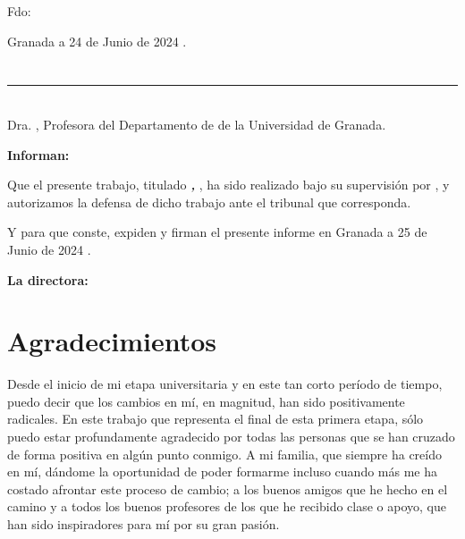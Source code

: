 \vspace{6cm}

\noindent Fdo: \myName

\vspace{2cm}

\begin{flushright}
Granada a 24 de Junio de 2024 .
\end{flushright}


\chapter*{}
\thispagestyle{empty}

\noindent\rule[-1ex]{\textwidth}{2pt}\\[4.5ex]

Dra. \textbf{\myProf}, Profesora del Departamento de \myDepartment de la Universidad de Granada.


\vspace{0.5cm}

\textbf{Informan:}

\vspace{0.5cm}

Que el presente trabajo, titulado \textit{\textbf{\myTitle, \mySubTitle}},
ha sido realizado bajo su supervisión por \textbf{\myName}, y autorizamos la defensa de dicho trabajo ante el tribunal que corresponda.

\vspace{0.5cm}

Y para que conste, expiden y firman el presente informe en Granada a 25 de Junio de 2024 .

\vspace{1cm}

\textbf{La directora:}

\vspace{5cm}

\noindent \textbf{}

\chapter*{Agradecimientos}
\thispagestyle{empty}
\vspace{1cm}


Desde el inicio de mi etapa universitaria y en este tan corto período de tiempo, puedo decir que los cambios en mí, en magnitud, han sido positivamente radicales. En este trabajo que representa el final de esta primera etapa, sólo puedo estar profundamente agradecido por todas las personas que se han cruzado de forma positiva en algún punto conmigo. A mi familia, que siempre ha creído en mí, dándome la oportunidad de poder formarme incluso cuando más me ha costado afrontar este proceso de cambio; a los buenos amigos que he hecho en el camino y a todos los buenos profesores de los que he recibido clase o apoyo, que han sido inspiradores para mí por su gran pasión.
